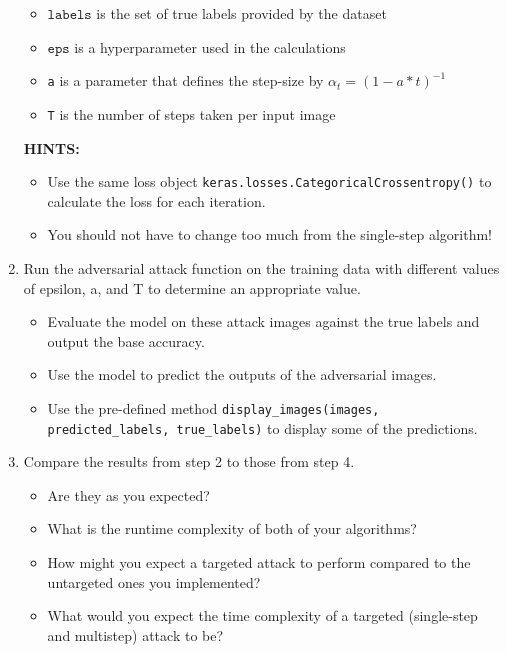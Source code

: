 \documentclass{article}
\begin{document}
\begin{enumerate}
\begin{itemize}
        \item $\texttt{labels}$ is the set of true labels provided by the dataset
        \item $\texttt{eps}$ is a hyperparameter used in the calculations
        \item \texttt{a} is a parameter that defines the step-size by $\alpha_t = (1 - a*t)^{-1}$
        \item \texttt{T} is the number of steps taken per input image
    \end{itemize}
    \textbf{HINTS:}
    \begin{itemize}
        \item Use the same loss object \texttt{keras.losses.CategoricalCrossentropy()} to calculate the loss for each iteration. 
        \item You should not have to change too much from the single-step algorithm!
    \end{itemize}
    \item Run the adversarial attack function on the training data with different values of epsilon, a, and T to determine an appropriate value.
    \begin{itemize}
        \item Evaluate the model on these attack images against the true labels and output the base accuracy. 
        \item Use the model to predict the outputs of the adversarial images.
        \item Use the pre-defined method \texttt{display\_images(images, predicted\_labels, true\_labels)} to display some of the predictions.
    \end{itemize}
    \item Compare the results from step 2 to those from step 4. 
    \begin{itemize}
        \item Are they as you expected?
        \item What is the runtime complexity of both of your algorithms?
        \item How might you expect a targeted attack to perform compared to the untargeted ones you implemented? 
        \item What would you expect the time complexity of a targeted (single-step and multistep) attack to be?
    \end{itemize}
    
\end{enumerate}
\end{document}
